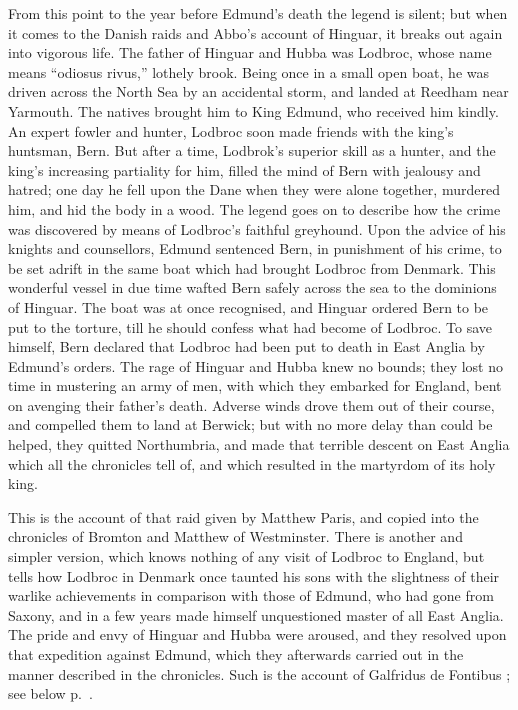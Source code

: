 \documentclass[10pt]{book}
\begin{document}
{From this point to the year before Edmund's death the legend is silent; but when it comes to the Danish raids and Abbo's account of Hinguar, it breaks out again into vigorous life. The father of Hinguar and Hubba was Lodbroc, whose name means ``odiosus rivus,'' lothely brook. Being once in a small open boat, he was driven across the North Sea by an accidental storm, and landed at Reedham near Yarmouth. The natives brought him to King Edmund, who received him kindly. An expert fowler and hunter, Lodbroc soon made friends with the king's huntsman, Bern. But after a time, Lodbrok's superior skill as a hunter, and the king's increasing partiality for him, filled the mind of Bern with jealousy and hatred; one day he fell upon the Dane when they were alone together, murdered him, and hid the body in a wood. The legend goes on to describe how the crime was discovered by means of Lodbroc's faithful greyhound. Upon the advice of his knights and counsellors, Edmund sentenced Bern, in punishment of his crime, to be set adrift in the same boat which had brought Lodbroc from Denmark. This wonderful vessel in due time wafted Bern safely across the sea to the dominions of Hinguar. The boat was at once recognised, and Hinguar ordered Bern to be put to the torture, till he should confess what had become of Lodbroc. To save himself, Bern declared that Lodbroc had been put to death in East Anglia by Edmund's orders. The rage of Hinguar and Hubba knew no bounds; they lost no time in mustering an army of  men, with which they embarked for England, bent on avenging their father's death. Adverse winds drove them out of their course, and compelled them to land at Berwick; but with no more delay than could be helped, they quitted Northumbria, and made that terrible descent on East Anglia which all the chronicles tell of, and which resulted in the martyrdom of its holy king.

This is the account of that raid given by Matthew Paris, and copied into the chronicles of Bromton and Matthew of Westminster. There is another and simpler version, which knows nothing of any visit of Lodbroc to England, but tells how Lodbroc in Denmark once taunted his sons with the slightness of their warlike achievements in comparison with those of Edmund, who had gone from Saxony, and in a few years made himself unquestioned master of all East Anglia. The pride and envy of Hinguar and Hubba were aroused, and they resolved upon that expedition against Edmund, which they afterwards carried out in the manner described in the chronicles. Such is the account of Galfridus de Fontibus ; see below p.\ .

}
\end{document}
